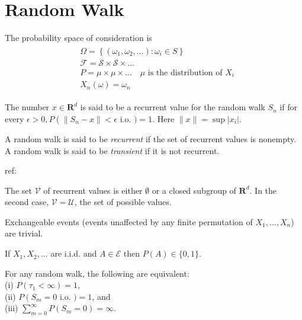 
\section{Random Walk}

The probability space of consideration is
\begin{align}
\begin{aligned}
&\Omega=\left\{\left(\omega_1, \omega_2, \ldots\right): \omega_i \in S\right\} \\
&\mathcal{F}=\mathcal{S} \times \mathcal{S} \times \ldots \quad \\
&P=\mu \times \mu \times \ldots \quad \mu \text { is the distribution of } X_i \\
&X_n(\omega)=\omega_n
\end{aligned}
\end{align}

\begin{definition}[Recurrence]
	The number $x \in \mathbf{R}^d$ is said to be a recurrent value for the random walk $S_n$ if for every $\epsilon>0, P\left(\left\|S_n-x\right\|<\epsilon\right.$ i.o. $)=1 .$ Here $\|x\|=\sup \left|x_i\right|$.

	A random walk is said to be \textit{recurrent} if the set of recurrent values is nonempty. A random walk is said to be \textit{transient} if it is not recurrent.

	ref: \cite{durrettProbabilityTheory}
\end{definition}

\begin{theorem}
	The set $\mathcal{V}$ of recurrent values is either $\emptyset$ or a closed subgroup of $\mathbf{R}^d$. In the second case, $\mathcal{V}=\mathcal{U}$, the set of possible values.
\end{theorem}


\begin{theorem}
	Exchangeable events (events unaffected by any finite permutation of $X_1, \ldots, X_n$) are trivial.

	If $X_1, X_2, \ldots$ are i.i.d. and $A \in \mathcal{E}$ then $P(A) \in\{0,1\}$.
\end{theorem}

\begin{theorem}
	For any random walk, the following are equivalent: \\
(i) $P\left(\tau_1<\infty\right)=1$,\\ (ii) $P\left(S_m=0\right.$ i.o. $)=1$, and\\(iii) $\sum_{m=0}^{\infty} P\left(S_m=0\right)=\infty$.
\end{theorem}


